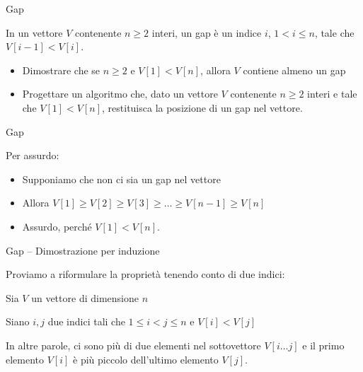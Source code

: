\begin{frame}{Gap}

\vspace{-9pt}
\begin{myboxtitle}[Gap]
In un vettore $V$ contenente $n \geq 2$ interi, un \alert{gap} è un indice $i$, $1 < i \leq n$,
tale che $V[i-1]<V[i]$.
\begin{itemize}
\item Dimostrare che se $n \geq 2$ e $V[1]<V[n]$, allora $V$ contiene almeno un gap
\item Progettare un algoritmo che, dato un vettore $V$ contenente $n \geq 2$
interi e tale che $V[1]<V[n]$, restituisca la posizione di un gap nel vettore.
\end{itemize}
\end{myboxtitle}

\end{frame}

\begin{frame}{Gap}

Per assurdo:
\begin{itemize}
\item Supponiamo che non ci sia un gap nel vettore
\item Allora $V[1] \geq  V[2] \geq V[3] \geq \ldots \geq V[n-1] \geq V[n]$
\item Assurdo, perché $V[1]<V[n]$.
\end{itemize}
\end{frame}

\begin{frame}{Gap -- Dimostrazione per induzione}

Proviamo a riformulare la proprietà tenendo conto di due indici:
\BIL
\item Sia $V$ un vettore di dimensione $n$
\item Siano $i,j$ due indici tali che  
$1 \leq i < j \leq n$ e $V[i]<V[j]$
\EIL

\medskip
In altre parole, ci sono più di due elementi nel sottovettore
$V[i \ldots j]$ e il primo elemento $V[i]$ è più piccolo dell'ultimo
elemento $V[j]$.
\end{frame}

